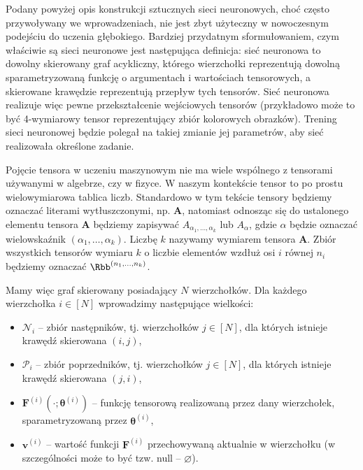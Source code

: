 \documentclass{myclass}
\begin{document}
Podany powyżej opis konstrukcji sztucznych sieci neuronowych, choć często przywoływany we
wprowadzeniach, nie jest zbyt użyteczny w nowoczesnym podejściu do uczenia głębokiego. Bardziej
przydatnym sformułowaniem, czym właściwie są sieci neuronowe jest następująca definicja: sieć
neuronowa to dowolny skierowany graf acykliczny, którego wierzchołki reprezentują dowolną
sparametryzowaną funkcję o argumentach i wartościach tensorowych, a skierowane krawędzie
reprezentują przepływ tych tensorów. Sieć neuronowa realizuje więc pewne przekształcenie wejściowych
tensorów (przykładowo może to być 4-wymiarowy tensor reprezentujący zbiór kolorowych obrazków).
Trening sieci neuronowej będzie polegał na takiej zmianie jej parametrów, aby sieć realizowała
określone zadanie.

\medskip

Pojęcie tensora w uczeniu maszynowym nie ma wiele wspólnego z tensorami używanymi w algebrze, czy w
fizyce. W naszym kontekście tensor to po prostu wielowymiarowa tablica liczb. Standardowo w tym
tekście tensory będziemy oznaczać literami wytłuszczonymi, np. \(\bm{A}\), natomiast odnosząc się do
ustalonego elementu tensora \(\bm{A}\) będziemy zapisywać \(A_{\alpha_1,\ldots,\alpha_k}\) lub
\(A_\alpha\), gdzie \(\alpha\) będzie oznaczać wielowskaźnik \((\alpha_1,\ldots,\alpha_k)\). Liczbę
\(k\) nazywamy wymiarem tensora \(\bm{A}\). Zbiór wszystkich tensorów wymiaru \(k\) o liczbie
elementów wzdłuż osi \(i\) równej \(n_i\) będziemy oznaczać \(\Rbb^{(n_1,\ldots,n_k)}\).

\medskip

Mamy więc graf skierowany posiadający \(N\) wierzchołków. Dla każdego wierzchołka \(i \in [N]\)
wprowadzimy następujące wielkości:
\begin{itemize}
    \item \(\mathscr{N}_i\) -- zbiór następników, tj. wierzchołków \(j \in [N]\), dla których
    istnieje krawędź skierowana \((i,j)\),
    
    \item \(\mathscr{P}_i\) -- zbiór poprzedników, tj. wierzchołków \(j \in [N]\), dla których
    istnieje krawędź skierowana \((j,i)\),

    \item \(\bm{F}^{(i)}\left(\cdot ; \bm{\theta}^{(i)}\right)\) -- funkcję tensorową realizowaną
    przez dany wierzchołek, sparametryzowaną przez \(\bm{\theta}^{(i)}\),

    \item \(\bm{v}^{(i)}\) -- wartość funkcji \(\bm{F}^{(i)}\) przechowywaną aktualnie w wierzchołku
    (w szczególności może to być tzw. null -- \(\varnothing\)).

\end{itemize}
\end{document}
